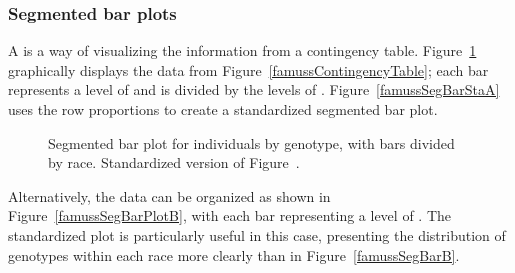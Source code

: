 \textD{\newpage}


\subsubsection{Segmented bar plots}

A  is a way of visualizing the information from a contingency table. Figure~\ref{famussSegBarPlotA} graphically displays the data from Figure~\ref{famussContingencyTable}; each bar represents a level of  and is divided by the levels of . Figure~\ref{famussSegBarStaA} uses the row proportions to create a standardized segmented bar plot. 


\begin{figure}[h]
	\centering
	\caption{ Segmented bar plot for individuals by genotype, with bars divided by race.  Standardized version of Figure~.}
	\label{famussSegBarPlotA}
\end{figure}

Alternatively, the data can be organized as shown in Figure~\ref{famussSegBarPlotB}, with each bar representing a level of . The standardized plot is particularly useful in this case, presenting the distribution of genotypes within each race more clearly than in Figure~\ref{famussSegBarB}.

